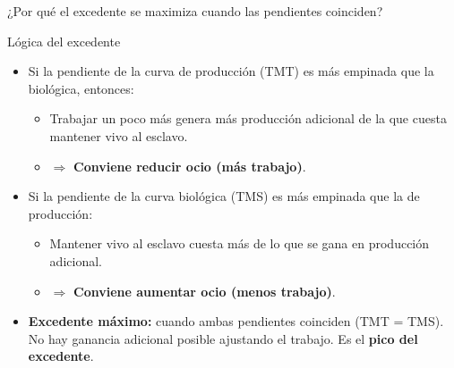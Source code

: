 \documentclass{beamer}
\begin{document}
\begin{frame}{¿Por qué el excedente se maximiza cuando las pendientes coinciden?}
    \begin{block}{Lógica del excedente}
    \begin{itemize}
        \item Si la pendiente de la curva de producción (TMT) es más empinada que la biológica, entonces:
        \begin{itemize}
            \item Trabajar un poco más genera más producción adicional de la que cuesta mantener vivo al esclavo.
            \item $\Rightarrow$ \textbf{Conviene reducir ocio (más trabajo)}.
        \end{itemize}
        
        \item Si la pendiente de la curva biológica (TMS) es más empinada que la de producción:
        \begin{itemize}
            \item Mantener vivo al esclavo cuesta más de lo que se gana en producción adicional.
            \item $\Rightarrow$ \textbf{Conviene aumentar ocio (menos trabajo)}.
        \end{itemize}
        
        \item \textbf{Excedente máximo:} cuando ambas pendientes coinciden (TMT = TMS). No hay ganancia adicional posible ajustando el trabajo. 
        Es el \textbf{pico del excedente}.
    \end{itemize}
    \end{block}
\end{frame}
\end{document}
